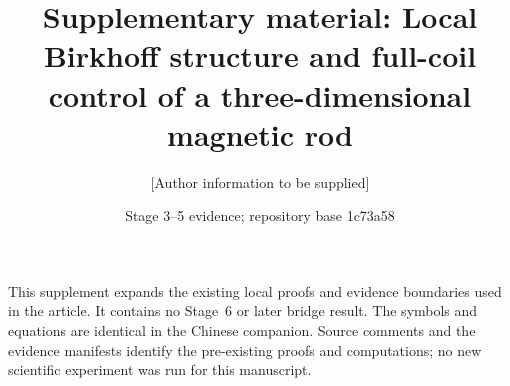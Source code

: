\documentclass[11pt,a4paper]{article}
\title{Supplementary material: Local Birkhoff structure and full-coil control of a three-dimensional magnetic rod}
\author{[Author information to be supplied]}
\date{Stage 3--5 evidence; repository base 1c73a58}
\begin{document}
\maketitle
\noindent This supplement expands the existing local proofs and evidence boundaries used in the article. It contains no Stage~6 or later bridge result. The symbols and equations are identical in the Chinese companion. Source comments and the evidence manifests identify the pre-existing proofs and computations; no new scientific experiment was run for this manuscript.
\tableofcontents





\end{document}
